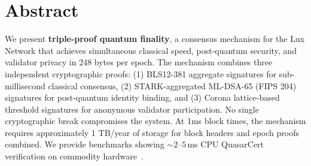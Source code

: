 \section*{Abstract}


We present \textbf{triple-proof quantum finality}, a consensus mechanism for the Lux Network that achieves simultaneous classical speed, post-quantum security, and validator privacy in 248 bytes per epoch. The mechanism combines three independent cryptographic proofs: (1) BLS12-381 aggregate signatures for sub-millisecond classical consensus, (2) STARK-aggregated ML-DSA-65 (FIPS 204) signatures for post-quantum identity binding, and (3) Corona lattice-based threshold signatures for anonymous validator participation. No single cryptographic break compromises the system. At 1ms block times, the mechanism requires approximately 1 TB/year of storage for block headers and epoch proofs combined. We provide benchmarks showing ${\sim}2$--$5$\,ms CPU QuasarCert verification on commodity hardware~\cite{lux-benchmarks}.

